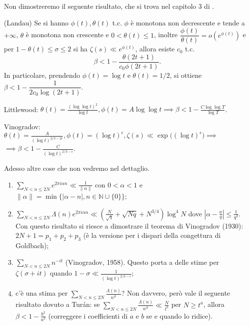 Non dimostreremo il seguente risultato, che si trova nel capitolo 3 di \cite{T}.

\begin{thm}
  (Landau) Se si hanno $\phi(t), \theta(t)$ t.c. $\phi$ è monotona non decrescente e tende a $+\infty$, $\theta$ è monotona non crescente e $0 < \theta(t) \le 1$, inoltre $\dfrac{\phi(t)}{\theta(t)}=o(e^{\phi(t)})$ e per $1-\theta(t) \le \sigma \le 2$ si ha $\zeta(s) \ll e^{\phi(t)}$, allora esiste $c_0$ t.c.
  $$\beta<1-\frac{\theta(2t+1)}{c_0\phi(2t+1)}.$$
  In particolare, prendendo $\phi(t)=\log{t}$ e $\theta(t)=1/2$, si ottiene $\beta<1-\dfrac{1}{2c_0\log(2t+1)}$.
\end{thm}

Littlewood: $\theta(t)=\frac{(\log\log{t})^2}{\log{t}}, \phi(t)=A\log\log{t} \implies \beta<1-\frac{C\log\log{T}}{\log{T}}$.

Vinogradov: $\theta(t)=\frac{A}{(\log{t})^{2/3-2\epsilon}}, \phi(t)=(\log{t})^{\epsilon}, \zeta(s) \ll \exp\big((\log{t})^{\epsilon}\big) \implies$ \\
$\implies \beta<1-\frac{C}{(\log{t})^{2/3-\epsilon}}$.

Adesso altre cose che non vedremo nel dettaglio.

\begin{enumerate}
  \item $\displaystyle \sum_{N<n \le 2N} e^{2\pi i\alpha n} \ll \frac{1}{\|\alpha\|}$ con $0<\alpha<1$ e $\|\alpha\|=\min\big\{|\alpha-n|, n \in \mathbb{N}\cup\{0\}\big\}$;
  \item $\displaystyle \sum_{N<n \le 2N} \Lambda(n)e^{2\pi i\alpha n} \ll \left(\frac{N}{\sqrt{q}}+\sqrt{Nq}+N^{3/4}\right)\log^4{N}$ dove $\left|\alpha-\frac{a}{q}\right| \le \frac{1}{q^2}$.
  Con questo risultato si riesce a dimostrare il teorema di Vinogradov (1930): $2N+1=p_1+p_2+p_3$ (è la versione per i dispari della congettura di Goldbach);
  \item $\displaystyle \sum_{N<n \le 2N} n^{-it}$ (Vinogradov, 1958). Questo porta a delle stime per $\zeta(\sigma+it)$ quando $1-\sigma \ll \frac{1}{(\log{t})^{2/3-\epsilon}}$;
  \item c'è una stima per $\displaystyle \sum_{N<n \le 2N} \frac{\Lambda(n)}{n^{it}}$? Non davvero, però vale il seguente risultato dovuto a Turán: se $\displaystyle \sum_{N<n \le 2N} \frac{\Lambda(n)}{n^{it}} \ll \frac{N}{t^b}$ per $N \ge t^a$, allora $\beta<1-\frac{b^2}{a^3}$ (correggere i coefficienti di $a$ e $b$ se e quando lo ridice).
\end{enumerate}
